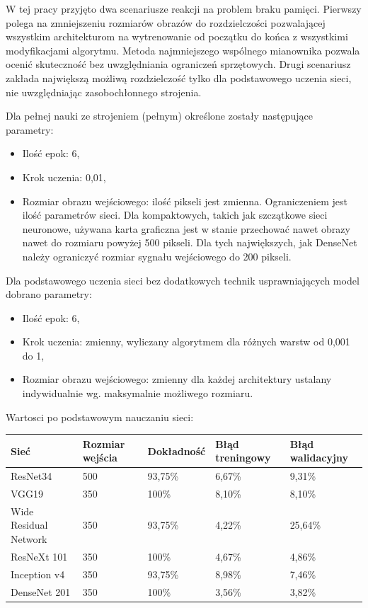 \documentclass[12pt,a4paper,twoside,titlepage,openright]{book}
\begin{document}
\begin{itemize}
\begin{itemize}
W tej pracy przyjęto dwa scenariusze reakcji na problem braku pamięci. Pierwszy polega na zmniejszeniu rozmiarów obrazów do rozdzielczości pozwalającej wszystkim architekturom na wytrenowanie od początku do końca z wszystkimi modyfikacjami algorytmu. Metoda najmniejszego wspólnego mianownika pozwala ocenić skuteczność bez uwzględniania ograniczeń sprzętowych. Drugi scenariusz zakłada największą możliwą rozdzielczość tylko dla podstawowego uczenia sieci, nie uwzględniając zasobochłonnego strojenia.

Dla pełnej nauki ze strojeniem (pełnym) określone zostały następujące parametry:
\begin{itemize}
\item Ilość epok: 6,
\item Krok uczenia: 0,01,
\item Rozmiar obrazu wejściowego: ilość pikseli jest zmienna. Ograniczeniem jest ilość parametrów sieci. Dla kompaktowych, takich jak szczątkowe sieci neuronowe, używana karta graficzna jest w stanie przechować nawet obrazy nawet do rozmiaru powyżej 500 pikseli. Dla tych największych, jak DenseNet należy ograniczyć rozmiar sygnału wejściowego do 200 pikseli.
\end{itemize}

Dla podstawowego uczenia sieci bez dodatkowych technik usprawniających model dobrano parametry:
\begin{itemize}
\item Ilość epok: 6,
\item Krok uczenia: zmienny, wyliczany algorytmem dla różnych warstw od 0,001 do 1,
\item Rozmiar obrazu wejściowego: zmienny dla każdej architektury ustalany indywidualnie wg. maksymalnie możliwego rozmiaru.
\end{itemize}

Wartosci po podstawowym nauczaniu sieci:
\begin{center}
    \begin{tabular}{ | l | l | l | l | l |}
    \hline
    Sieć & Rozmiar wejścia & Dokładność & Błąd treningowy & Błąd walidacyjny \\ \hline
    ResNet34 & 500 & 93,75\% & 6,67\% & 9,31\% \\ \hline
    VGG19 & 350 & 100\%& 8,10\% & 8,10\%\\ \hline
    Wide Residual Network & 350 & 93,75\% & 4,22\% & 25,64\% \\ \hline
    ResNeXt 101 & 350 & 100\%& 4,67\% & 4,86\%\\\hline
    Inception v4 & 350 & 93,75\% & 8,98\% & 7,46\% \\ \hline
    DenseNet 201 & 350 & 100\% & 3,56\% & 3,82\% \\ \hline
    \end{tabular}
\end{center}


\end{itemize}
\end{itemize}
\end{document}
